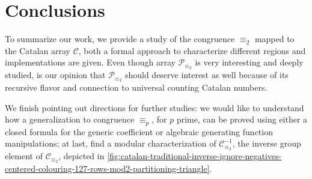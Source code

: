 
\section{Conclusions}
\label{sec:conclusions}


To summarize our work, we provide a study of the congruence
$\equiv_{2}$ mapped to the Catalan array $\mathcal{C}$, both a formal
approach to characterize different regions and implementations are
given. Even though array $\mathcal{P}_{\equiv_{2}}$ is very
interesting and deeply studied, is our opinion that
$\mathcal{P}_{\equiv_{2}}$ should deserve interest as well because of
its recursive flavor and connection to universal counting Catalan
numbers.

We finish pointing out directions for further studies: we would like
to understand how a generalization to congruence $\equiv_{p}$, for $p$
prime, can be proved using either a closed formula for the generic
coefficient or algebraic generating function manipulations; at last,
find a modular characterization of $\mathcal{C}_{\equiv_{2}}^{-1}$,
the inverse group element of $\mathcal{C}_{\equiv_{2}}$, depicted in
\autoref{fig:catalan-traditional-inverse-ignore-negatives-centered-colouring-127-rows-mod2-partitioning-triangle}.


